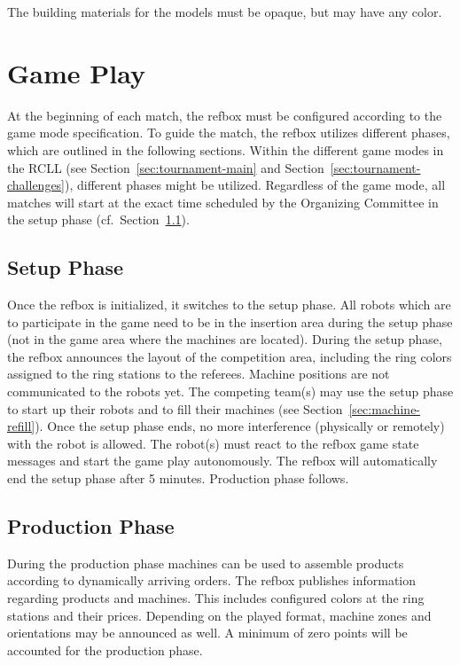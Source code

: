\documentclass[12pt,twoside]{article}
\newcommand{\refsec}[1]{Section~\ref{#1}}
\begin{document}
The building materials for the models must be opaque, but may have any color.

\section{Game Play}
At the beginning of each match, the \ac{refbox} must be configured according to
the game mode specification.
To guide the match, the \ac{refbox} utilizes different phases,
which are outlined in the following sections. Within the different game modes in
the \ac{RCLL} (see \refsec{sec:tournament-main} and
\refsec{sec:tournament-challenges}), different phases might be utilized.
Regardless of the game mode, all matches will
start at the exact time scheduled by the Organizing Committee in the setup phase
(cf.~\refsec{sec:setup-phase}).


\subsection{Setup Phase}
\label{sec:setup-phase}
Once the \ac{refbox} is initialized, it switches to the setup phase.
All robots which are to
participate in the game need to be in the insertion area during the setup phase
(not in the game area where the machines are located).
During the setup phase, the \ac{refbox} announces the layout of the competition
area, including the ring colors assigned to the ring stations to the referees.
Machine positions are not communicated to the robots yet.
The competing team(s) may use the setup phase to start up their  %
robots and to fill their machines (see \refsec{sec:machine-refill}).
Once the setup phase ends, no more interference (physically or remotely) with
the robot is allowed. The robot(s) must react to the \ac{refbox} %
game state messages and start the game play autonomously.
The \ac{refbox} will automatically end the setup phase after 5 minutes.
Production phase follows.

\subsection{Production Phase}
\label{sec:production-phase}
During the production phase machines can be used to assemble products
according to dynamically arriving orders.
The \ac{refbox} publishes information regarding products and machines.
This includes configured colors at the ring stations and their
prices.
Depending on the played format, machine zones and orientations may be announced
as well.
A minimum of zero points will be accounted for the production phase.
\end{document}
